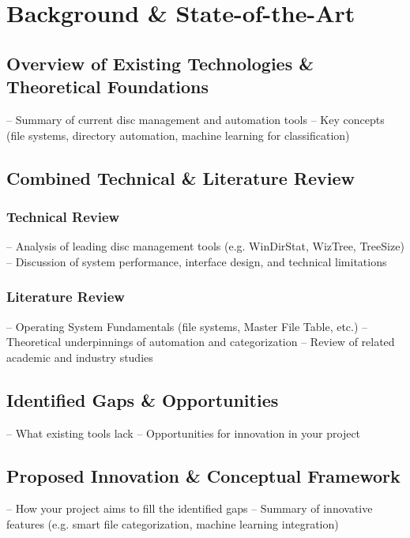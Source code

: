 \section{Background \& State-of-the-Art}

\subsection{Overview of Existing Technologies \& Theoretical Foundations}
– Summary of current disc management and automation tools
– Key concepts (file systems, directory automation, machine learning for classification)
\subsection{Combined Technical \& Literature Review}
\subsubsection{Technical Review}
– Analysis of leading disc management tools (e.g. WinDirStat, WizTree, TreeSize)
– Discussion of system performance, interface design, and technical limitations
\subsubsection{Literature Review}
– Operating System Fundamentals (file systems, Master File Table, etc.)
– Theoretical underpinnings of automation and categorization
– Review of related academic and industry studies
\subsection{Identified Gaps \& Opportunities}
– What existing tools lack
– Opportunities for innovation in your project
\subsection{Proposed Innovation \& Conceptual Framework}
– How your project aims to fill the identified gaps
– Summary of innovative features (e.g. smart file categorization, machine learning integration)